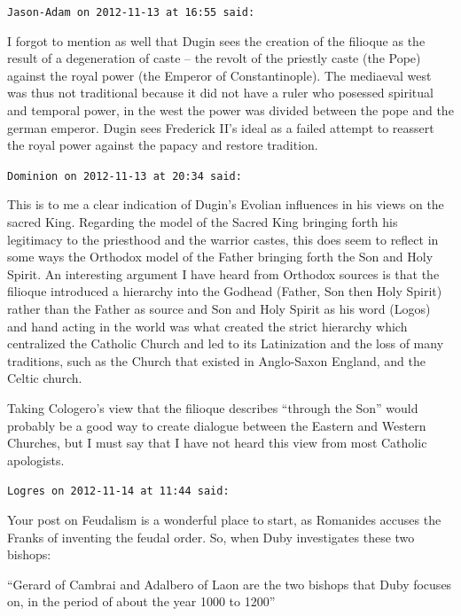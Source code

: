 \begin{footnotesize}
\begin{sffamily}
\texttt{Jason-Adam on 2012-11-13 at 16:55 said:}

I forgot to mention as well that Dugin sees the creation of the filioque as the result of a degeneration of caste -- the revolt of the priestly caste (the Pope) against the royal power (the Emperor of Constantinople). The mediaeval west was thus not traditional because it did not have a ruler who posessed spiritual and temporal power, in the west the power was divided between the pope and the german emperor. Dugin sees Frederick II's ideal as a failed attempt to reassert the royal power against the papacy and restore tradition.

\hfill

\texttt{Dominion on 2012-11-13 at 20:34 said:}

This is to me a clear indication of Dugin's Evolian influences in his views on the sacred King. Regarding the model of the Sacred King bringing forth his legitimacy to the priesthood and the warrior castes, this does seem to reflect in some ways the Orthodox model of the Father bringing forth the Son and Holy Spirit. An interesting argument I have heard from Orthodox sources is that the filioque introduced a hierarchy into the Godhead (Father, Son then Holy Spirit) rather than the Father as source and Son and Holy Spirit as his word (Logos) and hand acting in the world was what created the strict hierarchy which centralized the Catholic Church and led to its Latinization and the loss of many traditions, such as the Church that existed in Anglo-Saxon England, and the Celtic church.

Taking Cologero's view that the filioque describes ``through the Son'' would probably be a good way to create dialogue between the Eastern and Western Churches, but I must say that I have not heard this view from most Catholic apologists.

\hfill

\texttt{Logres on 2012-11-14 at 11:44 said:}

Your post on Feudalism is a wonderful place to start, as Romanides accuses the Franks of inventing the feudal order. So, when Duby investigates these two bishops:

``Gerard of Cambrai and Adalbero of Laon are the two bishops that Duby focuses on, in the period of about the year 1000 to 1200''


\end{sffamily}
\end{footnotesize}
